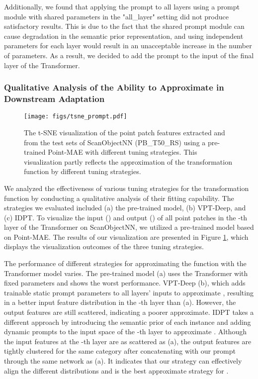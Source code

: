 \documentclass[10pt,twocolumn,letterpaper]{article}
\begin{document}
Additionally, we found that applying the prompt to all layers using a prompt module with shared parameters in the "all\_layer" setting did not produce satisfactory results. This is due to the fact that the shared prompt module can cause degradation in the semantic prior representation, and using independent parameters for each layer would result in an unacceptable increase in the number of parameters. As a result, we decided to add the prompt to the input of the final layer of the Transformer.

\subsubsection{Qualitative Analysis of the Ability to Approximate  in Downstream Adaptation} 

\begin{figure}[t]
\centering
\texttt{[image: figs/tsne\_prompt.pdf]} 
\caption{The t-SNE visualization of the point patch features extracted  and  from the test sets of ScanObjectNN (PB\_T50\_RS) using a pre-trained Point-MAE with different tuning strategies. This visualization partly reflects the approximation of the transformation function  by different tuning strategies.}
\label{tsne_prompt}
\end{figure}


We analyzed the effectiveness of various tuning strategies for the transformation function  by conducting a qualitative analysis of their fitting capability. The strategies we evaluated included (a) the pre-trained model, (b) VPT-Deep, and (c) IDPT. To visualize the input () and output () of all point patches in the -th layer of the Transformer on ScanObjectNN, we utilized a pre-trained model based on Point-MAE. The results of our visualization are presented in Figure \ref{tsne_prompt}, which displays the visualization outcomes of the three tuning strategies.


The performance of different strategies for approximating the function  with the Transformer model varies. The pre-trained model (a) uses the Transformer with fixed parameters and shows the worst performance. VPT-Deep (b), which adds trainable static prompt parameters to all layers' inputs to approximate , resulting in a better input feature distribution  in the -th layer than (a). However, the output features  are still scattered, indicating a poorer  approximate. IDPT takes a different approach by introducing the semantic prior of each instance and adding dynamic prompts to the input space of the -th layer to approximate . Although the input features  at the -th layer are as scattered as (a), the output features  are tightly clustered for the same category after concatenating  with our prompt through the same network as (a). It indicates that our strategy can effectively align the different distributions and is the best approximate strategy for .
\end{document}
